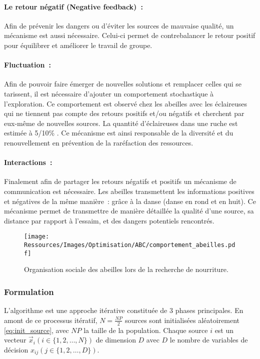 \paragraph{Le retour négatif (Negative feedback)~:} %
\label{par:negative_feedback}
Afin de prévenir les dangers ou d’éviter les sources de mauvaise qualité, un
mécanisme est aussi nécessaire. Celui-ci permet de contrebalancer le retour
positif pour équilibrer et améliorer le travail de groupe.

\paragraph{Fluctuation~:} %
\label{par:fluctuation}
Afin de pouvoir faire émerger de nouvelles solutions et remplacer celles qui se tarissent,
il est nécessaire d’ajouter un comportement stochastique à l’exploration. Ce comportement
est observé chez les abeilles avec les éclaireuses qui ne tiennent pas compte des retours
positifs et/ou négatifs et cherchent par eux-même de nouvelles sources. La quantité
d’éclaireuses dans une ruche est estimée à 5/10\si{\percent} \parencite{Seeley1996}. Ce
mécanisme est ainsi responsable de la diversité et du renouvellement en prévention de la
raréfaction des ressources.

\paragraph{Interactions~:} %
\label{par:intractions}
Finalement afin de partager les retours négatifs et positifs un mécanisme de
communication est nécessaire.
Les abeilles transmettent les informations positives et négatives de la même
manière~: grâce à la danse (danse en rond et en huit).
Ce mécanisme permet de transmettre de manière détaillée la qualité d’une source, sa
distance par rapport à l’essaim, et des dangers potentiels rencontrés.

\begin{figure}
    \centering
    \texttt{[image: Ressources/Images/Optimisation/ABC/comportement\_abeilles.pdf]}
    \caption{Organisation sociale des abeilles lors de la recherche de nourriture.}
    \label{fig:bee_dance}
\end{figure}


\subsubsection{Formulation} %
\label{ssub:formulation}
L’algorithme  est une approche itérative constituée de 3 phases principales.
En amont de ce processus itératif, $N = \frac{NP}{2}$ sources sont initialisées
aléatoirement \eqref{eq:init_source}, avec $NP$ la taille de la population.
Chaque source $i$ est un vecteur $\vec{x}_{i}(i \in \{1, 2, \dotsc, N\})$ de dimension $D$
avec $D$ le nombre de variables de décision $x_{ij} (j \in \{1, 2, \dotsc, D\})$.

